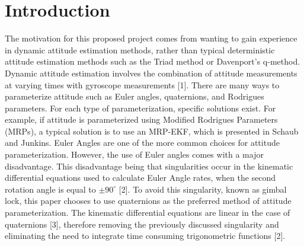 \documentclass[12pt]{report}
\begin{document}
\newpage
\section*{Introduction}
\noindent The motivation for this proposed project comes from wanting to gain experience in dynamic attitude estimation methods, rather than typical deterministic attitude estimation methods such as the Triad method or Davenport's q-method.  Dynamic attitude estimation involves the combination of attitude measurements at varying times with gyroscope measurements [1]. There are many ways to parameterize attitude such as Euler angles, quaternions, and Rodrigues parameters. For each type of parameterization, specific solutions exist. For example, if attitude is parameterized using Modified Rodrigues Parameters (MRPs), a typical solution is to use an MRP-EKF, which is presented in Schaub and Junkins. Euler Angles are one of the more common choices for attitude parameterization. However, the use of Euler angles comes with a major disadvantage. This disadvantage being that singularities occur in the kinematic differential equations used to calculate Euler Angle rates, when the second rotation angle is equal to $\pm{90^\circ} $ [2]. To avoid this singularity, known as gimbal lock, this paper chooses to use quaternions as the preferred method of attitude parameterization. The kinematic differential equations are linear in the case of quaternions [3], therefore removing the previously discussed singularity and eliminating the need to integrate time consuming trigonometric functions [2].\\
\end{document}
